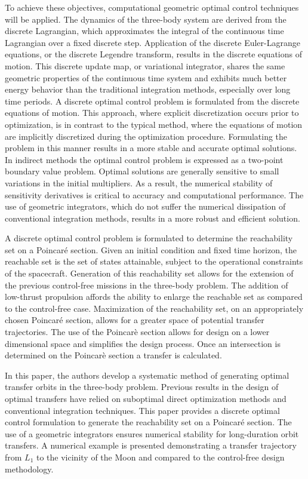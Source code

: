 \documentclass[letterpaper, preprint, paper,11pt]{AAS}	%
\begin{document}
To achieve these objectives, computational geometric optimal control techniques will be applied. 
The dynamics of the three-body system are derived from the discrete Lagrangian, which approximates the integral of the continuous time Lagrangian over a fixed discrete step.
Application of the discrete Euler-Lagrange equations, or the discrete Legendre transform, results in the discrete equations of motion.
This discrete update map, or variational integrator, shares the same geometric properties of the continuous time system and exhibits much better energy behavior than the traditional integration methods, especially over long time periods.
A discrete optimal control problem is formulated from the discrete equations of motion.
This approach, where explicit discretization occurs prior to optimization,  is in contrast to the typical method, where the equations of motion are implicitly discretized during the optimization procedure.
Formulating the problem in this manner results in a more stable and accurate optimal solutions. 
In indirect methods the optimal control problem is expressed as a two-point boundary value problem.
Optimal solutions are generally sensitive to small variations in the initial multipliers.
As a result, the numerical stability of sensitivity derivatives is critical to accuracy and computational performance. 
The use of geometric integrators, which do not suffer the numerical dissipation of conventional integration methods, results in a more robust and efficient solution.

A discrete optimal control problem is formulated to determine the reachability set on a Poincar\'e section.
Given an initial condition and fixed time horizon, the reachable set is the set of states attainable, subject to the operational constraints of the spacecraft. 
Generation of this reachability set allows for the extension of the previous control-free missions in the three-body problem. 
The addition of low-thrust propulsion affords the ability to enlarge the reachable set as compared to the control-free case.
Maximization of the reachability set, on an appropriately chosen Poincar\'e section, allows for a greater space of potential transfer trajectories.
The use of the Poincar\`e section allows for design on a lower dimensional space and simplifies the design process.
Once an intersection is determined on the Poincar\`e section a transfer is calculated.

In this paper, the authors develop a systematic method of generating optimal transfer orbits in the three-body problem.
Previous results in the design of optimal transfers have relied on suboptimal direct optimization methods and conventional integration techniques.
This paper provides a discrete optimal control formulation to generate the reachability set on a Poincar\'e section.
The use of a geometric integrators ensures numerical stability for long-duration orbit transfers.
A numerical example is presented demonstrating a transfer trajectory from \( L_1 \) to the vicinity of the Moon and compared to the control-free design methodology.
\end{document}
